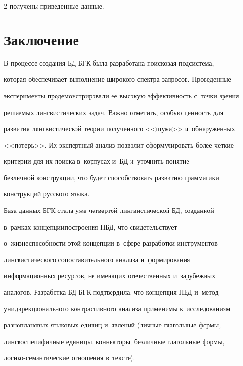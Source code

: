 \begin{multicols}{2}
получены приведенные данные.

  







\section{Заключение}



  В процессе создания БД БГК была разработана поисковая подсистема, 

которая обеспечивает выполнение широкого спектра запросов. Проведенные 

эксперименты продемонстрировали ее высокую эффективность с~точки зрения 

решаемых лингвистических задач. Важно отметить, особую ценность для 

развития лингвистической теории полученного <<шума>> и~обнаруженных 

<<потерь>>. Их экспертный анализ позволит сформулировать более четкие 

критерии для их поиска в~корпусах и~БД и~уточнить понятие 

безличной конструкции, что будет способствовать развитию грамматики 

конструкций русского языка. 

  

  База данных БГК стала уже четвертой лингвистической БД, созданной 

в~рамках концепции\linebreak построения НБД, что свидетельствует 

о~жизнеспособности этой концепции в~сфере разработки инструментов 

лингвистического сопоставительного анализа и~формирования 

информационных ресурсов, не имеющих отечественных и~зарубежных 

аналогов. Разработка БД БГК подтвердила, что концепция НБД и~метод 

унидирекционального контрастивного анализа применимы к~исследованиям 

разноплановых языковых единиц и~явлений (личные глагольные формы, 

лингвоспецифичные единицы, коннекторы, безличные глагольные формы,  

ло\-ги\-ко-се\-ман\-ти\-че\-ские отношения в~тексте).


\end{multicols}
